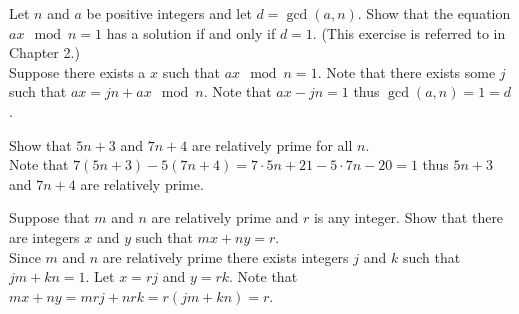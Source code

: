 \documentclass[12pt]{article}
\makeatletter
\theoremstyle{homework}
\newenvironment{exercise}[1]
{\def\@currentlabel{#1}\exercisecore}
{\endexercisecore}
\makeatother
\begin{document}
\begin{exercise}
{11}
Let $n$ and $a$ be positive integers and let $d = \gcd(a, n)$. Show that the equation $ax \mod n = 1$ has a solution if and only if $d = 1$. (This exercise is referred to in Chapter 2.)\\
Suppose there exists a $x$ such that $ax \mod n = 1$.  Note that there exists some $j$ such that $ax=jn+ax \mod n$.  Note that $ax-jn=1$ thus $\gcd(a, n)=1=d$.
\end{exercise}

\begin{exercise}
{12}
Show that $5n + 3$ and $7n + 4$ are relatively prime for all $n$.\\
Note that $7(5n + 3)-5(7n + 4)=7\cdot 5n + 21-5\cdot 7n -20=1$ thus $5n + 3$ and $7n + 4$ are relatively prime.
\end{exercise}

\begin{exercise}
{13}
Suppose that $m$ and $n$ are relatively prime and $r$ is any integer. Show that there are integers $x$ and $y$ such that $mx + ny = r$.\\
Since $m$ and $n$ are relatively prime there exists integers $j$ and $k$ such that $jm+kn=1$.  Let $x=rj$ and $y=rk$.  Note that $mx + ny=mrj + nrk=r(jm+kn)=r$.
\end{exercise}
\end{document}
